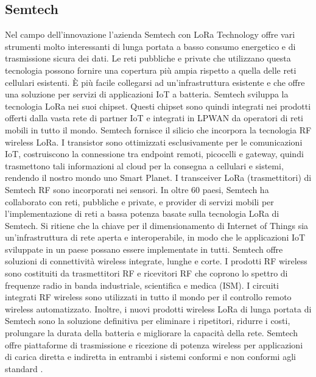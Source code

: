 \documentclass[a4paper]{report} %
\begin{document}
\subsection{Semtech}
Nel campo dell'innovazione l'azienda Semtech con LoRa Technology offre vari strumenti molto interessanti di lunga portata a basso consumo energetico e di trasmissione sicura dei dati. Le reti pubbliche e private che utilizzano questa tecnologia possono fornire una copertura più ampia rispetto a quella delle reti cellulari esistenti. È più facile collegarsi ad un'infrastruttura esistente e che offre una soluzione per servizi di applicazioni IoT a batteria. Semtech sviluppa la tecnologia LoRa nei suoi chipset. Questi chipset sono quindi integrati nei prodotti offerti dalla vasta rete di partner IoT e integrati in LPWAN da operatori di reti mobili in tutto il mondo. 
Semtech fornisce il silicio che incorpora la tecnologia RF wireless LoRa. I transistor sono ottimizzati esclusivamente per le comunicazioni IoT, costruiscono la connessione tra endpoint remoti, picocelli e gateway, quindi trasmettono tali informazioni al cloud per la consegna a cellulari e sistemi, rendendo il nostro mondo uno Smart Planet. I transceiver LoRa (trasmettitori) di Semtech RF sono incorporati nei sensori.
In oltre 60 paesi, Semtech ha collaborato con reti, pubbliche e private, e provider di servizi mobili per l'implementazione di reti a bassa potenza basate sulla tecnologia LoRa di Semtech. Si ritiene che la chiave per il dimensionamento di Internet of Things sia un'infrastruttura di rete aperta e interoperabile, in modo che le applicazioni IoT sviluppate in un paese possano essere implementate in tutti. 
Semtech offre soluzioni di connettività wireless integrate, lunghe e corte. I prodotti RF wireless sono costituiti da  trasmettitori RF e ricevitori RF che coprono lo spettro di frequenze radio in banda industriale, scientifica e medica (ISM). I circuiti integrati RF wireless sono utilizzati in tutto il mondo per il controllo remoto wireless automatizzato. Inoltre, i nuovi prodotti wireless LoRa di lunga portata di Semtech sono la soluzione definitiva per eliminare i ripetitori, ridurre i costi, prolungare la durata della batteria e migliorare la capacità della rete. Semtech offre piattaforme di trasmissione e ricezione di potenza wireless per applicazioni di carica diretta e indiretta in entrambi i sistemi conformi e non conformi agli standard \cite{art:rif.24}. 
\end{document}
